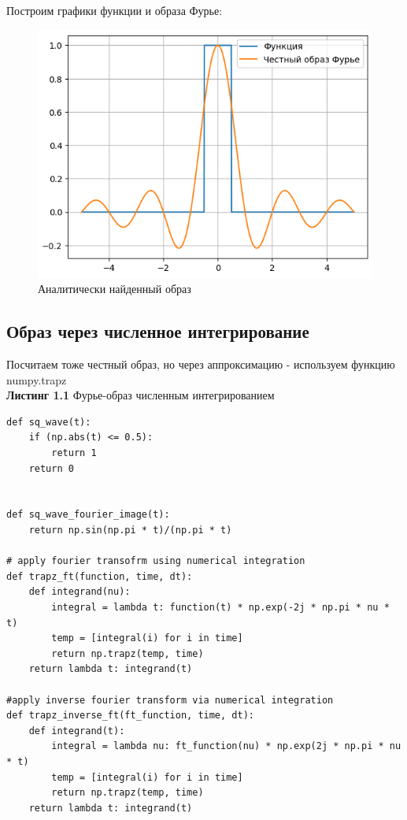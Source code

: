 \noindent Построим графики функции и образа Фурье:
\begin{figure}[!htb]
    \centering 
    \includegraphics[scale=0.7]{../img/1}
    \caption{Аналитически найденный образ}
\end{figure}
 
\subsection{Образ через численное интегрирование}
\noindent Посчитаем тоже честный образ, но через аппроксимацию - используем функцию numpy.trapz
\\
\noindent \textbf{Листинг 1.1} Фурье-образ численным интегрированием
\begin{lstlisting}
def sq_wave(t):
    if (np.abs(t) <= 0.5):
        return 1
    return 0


def sq_wave_fourier_image(t):
    return np.sin(np.pi * t)/(np.pi * t)

# apply fourier transofrm using numerical integration
def trapz_ft(function, time, dt):
    def integrand(nu):
        integral = lambda t: function(t) * np.exp(-2j * np.pi * nu * t)
        temp = [integral(i) for i in time]
        return np.trapz(temp, time)
    return lambda t: integrand(t)

#apply inverse fourier transform via numerical integration
def trapz_inverse_ft(ft_function, time, dt):
    def integrand(t):
        integral = lambda nu: ft_function(nu) * np.exp(2j * np.pi * nu * t)
        temp = [integral(i) for i in time]
        return np.trapz(temp, time)
    return lambda t: integrand(t)
\end{lstlisting}

